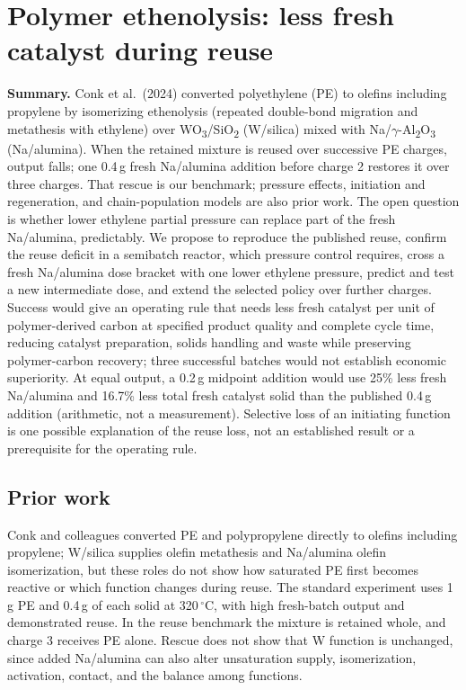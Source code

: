 \section{Polymer ethenolysis: less fresh catalyst during reuse}
\label{sec:polymer}

\textbf{Summary.} Conk et al.\ (2024) converted polyethylene (PE) to olefins including propylene by isomerizing ethenolysis (repeated double-bond migration and metathesis with ethylene) over WO\textsubscript{3}/SiO\textsubscript{2} (W/silica) mixed with Na/$\gamma$-Al\textsubscript{2}O\textsubscript{3} (Na/alumina). When the retained mixture is reused over successive PE charges, output falls; one 0.4\,g fresh Na/alumina addition before charge 2 restores it over three charges.\cite[Fig.~4B]{conk2024} That rescue is our benchmark; pressure effects, initiation and regeneration, and chain-population models are also prior work.\cite{conk2025thesis,hartwig2026patent,guironnet2020,chen2024,wang2022thesis} The open question is whether lower ethylene partial pressure can replace part of the fresh Na/alumina, predictably. We propose to reproduce the published reuse, confirm the reuse deficit in a semibatch reactor, which pressure control requires, cross a fresh Na/alumina dose bracket with one lower ethylene pressure, predict and test a new intermediate dose, and extend the selected policy over further charges. Success would give an operating rule that needs less fresh catalyst per unit of polymer-derived carbon at specified product quality and complete cycle time, reducing catalyst preparation, solids handling and waste while preserving polymer-carbon recovery; three successful batches would not establish economic superiority. At equal output, a 0.2\,g midpoint addition would use 25\% less fresh Na/alumina and 16.7\% less total fresh catalyst solid than the published 0.4\,g addition (arithmetic, not a measurement). Selective loss of an initiating function is one possible explanation of the reuse loss, not an established result or a prerequisite for the operating rule.

\subsection{Prior work}

Conk and colleagues converted PE and polypropylene directly to olefins including propylene; W/silica supplies olefin metathesis and Na/alumina olefin isomerization, but these roles do not show how saturated PE first becomes reactive or which function changes during reuse. The standard experiment uses 1\,g PE and 0.4\,g of each solid at 320\,$^\circ$C, with high fresh-batch output and demonstrated reuse.\cite{conk2024} In the reuse benchmark the mixture is retained whole, and charge 3 receives PE alone.\cite[Fig.~4B]{conk2024} Rescue does not show that W function is unchanged, since added Na/alumina can also alter unsaturation supply, isomerization, activation, contact, and the balance among functions.

